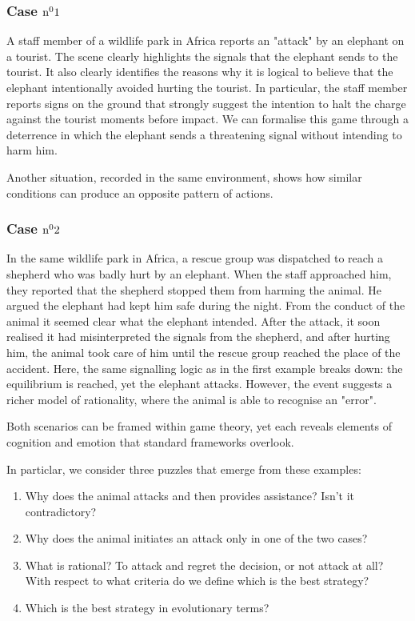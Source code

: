 \subsubsection*{Case \(\text{n}^{{\small{0}}}1\)} \label{sub:case1}
A staff member of a wildlife park in Africa reports an "attack" by an elephant on a tourist. The scene clearly highlights the signals that the elephant sends to the tourist. It also clearly identifies the reasons why it is logical to believe that the elephant intentionally avoided hurting the tourist.
In particular, the staff member reports signs on the ground that strongly suggest the intention to halt the charge against the tourist moments before impact.
We can formalise this game through a deterrence in which the elephant sends a threatening signal without intending to harm him.

\vspace{1em}
Another situation, recorded in the same environment, shows how similar conditions can produce an opposite pattern of actions.

\subsubsection*{Case \(\text{n}^{{\small{0}}}2\)} \label{sub:case2}
In the same wildlife park in Africa, a rescue group was dispatched to reach a shepherd who was badly hurt by an elephant. When the staff approached him, they reported that the shepherd stopped them from harming the animal. He argued the elephant had kept him safe during the night. From the conduct of the animal it seemed clear what the elephant intended. After the attack, it soon realised it had misinterpreted the signals from the shepherd, and after hurting him, the animal took care of him until the rescue group reached the place of the accident.
Here, the same signalling logic as in the first example breaks down: the equilibrium is reached, yet the elephant attacks. However, the event suggests a richer model of rationality, where the animal is able to recognise an "error".
\vspace{1em}

Both scenarios can be framed within game theory, yet each reveals elements of cognition and emotion that standard frameworks overlook.

In particlar, we consider three puzzles that emerge from these examples:

\begin{enumerate}
  \item Why does the animal attacks and then provides assistance? Isn't it contradictory?
  \item Why does the animal initiates an attack only in one of the two cases?
  \item What is rational? To attack and regret the decision, or not attack at all? With respect to what criteria do we define which is the best strategy?
  \item Which is the best strategy in evolutionary terms?
\end{enumerate}

